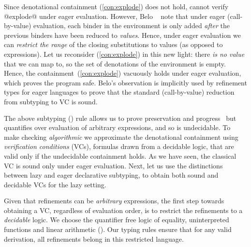 Since denotational containment (\ref{con:explode}) does not hold,
\hlang cannot verify @explode@ under eager evaluation.
%
However, Belo \etal~\cite{Greenberg11} note that under eager (call-by-value) 
evaluation, each binder in the environment is only added \emph{after} 
the previous binders have been reduced to \emph{values}. 
%
Hence, under eager evaluation we can \emph{restrict the range} of 
the closing substitutions to values (as opposed to expressions).
%
Let us reconsider (\ref{con:explode}) in this new light: 
%
there \emph{is no value} that we can map \ttn to, so the set of
denotations of the environment is empty. Hence, the 
containment~(\ref{con:explode}) vacuously holds under
eager evaluation, which proves the program safe.
%
Belo's observation 
is implicitly used by refinement types for eager languages
to prove that the standard (\ie call-by-value)
reduction from subtyping to VC is sound.

The above subtyping (\rtdsub) 
rule allows us to prove preservation and progress~\cite{Knowles10} 
but quantifies over evaluation of arbitrary expressions, 
and so is undecidable.
%
To make checking \emph{algorithmic} we approximate the 
denotational containment using \emph{verification conditions} (VCs), 
formulas drawn from a decidable logic, that are valid 
only if the undecidable containment holds.
%
As we have seen, the classical VC is sound only under 
eager evaluation. Next, let us use the distinctions 
between lazy and eager declarative subtyping, 
to obtain both sound and decidable VCs for the lazy setting. 

%
Given that \hlang refinements can be \emph{arbitrary} expressions,
the first step towards obtaining a VC, regardless of evaluation order,
is to restrict the refinements to a \emph{decidable} logic. 
%
We choose the quantifier free logic of equality, uninterpreted functions 
and linear arithmetic (\logiclang). 
%
Our typing rules ensure that for any valid derivation, all
refinements belong in this restricted language.

